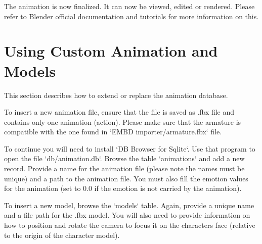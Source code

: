 \noindent The animation is now finalized. It can now be viewed, edited or rendered. Please refer to Blender official documentation and tutorials for more information on this.

\section{Using Custom Animation and Models}
This section describes how to extend or replace the animation database.

To insert a new animation file, ensure that the file is saved as .fbx file and contains only one animation (action). Please make sure that the armature is compatible with the one found in `EMBD importer/armature.fbx` file.

To continue you will need to install `DB Browser for Sqlite`. Use that program to open the file `db/animation.db`. Browse the table `animations` and add a new record. Provide a name for the animation file (please note the names must be unique) and a path to the animation file. You must also fill the emotion values for the animation (set to 0.0 if the emotion is not carried by the animation).

To insert a new model, browse the `models` table. Again, provide a unique name and a file path for the .fbx model. You will also need to provide information on how to position and rotate the camera to focus it on the characters face (relative to the origin of the character model).

